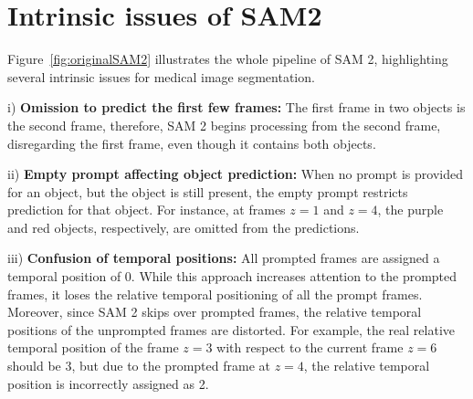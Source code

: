 \clearpage
\setcounter{page}{1}
\maketitlesupplementary

\section{Intrinsic issues of SAM2}
Figure~\ref{fig:originalSAM2} illustrates the whole pipeline of SAM 2, highlighting several intrinsic issues for medical image segmentation. 

i) \textbf{Omission to predict the first few frames:} The first frame in two objects is the second frame, therefore, SAM 2 begins processing from the second frame, disregarding the first frame, even though it contains both objects.

ii) \textbf{Empty prompt affecting object prediction:} When no prompt is provided for an object, but the object is still present, the empty prompt restricts prediction for that object. For instance, at frames $z=1$ and $z=4$, the purple and red objects, respectively, are omitted from the predictions. 

iii) \textbf{Confusion of temporal positions:} All prompted frames are assigned a temporal position of 0. While this approach increases attention to the prompted frames, it loses the relative temporal positioning of all the prompt frames. Moreover, since SAM 2 skips over prompted frames, the relative temporal positions of the unprompted frames are distorted. 
For example, the real relative temporal position of the frame $z=3$ with respect to the current frame $z=6$ should be 3, but due to the prompted frame at $z=4$, the relative temporal position is incorrectly assigned as 2.

